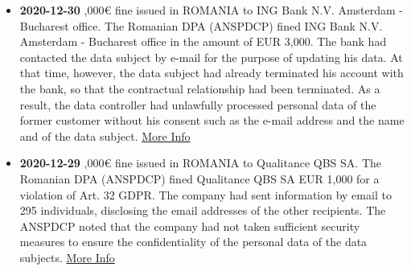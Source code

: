 \documentclass[12pt]{article}
\begin{document}
\newpage
\justify
	\begin{multicols}{2}
		\begin{itemize}
			\item \textbf{2020-12-30} ,000€ fine issued in ROMANIA to ING Bank N.V. Amsterdam - Bucharest office.
			\newline
			The Romanian DPA (ANSPDCP) fined ING Bank N.V. Amsterdam - Bucharest office in the amount of EUR 3,000. The bank had contacted the data subject by e-mail for the purpose of updating his data. At that time, however, the data subject had already terminated his account with the bank, so that the contractual relationship had been terminated. As a result, the data controller had unlawfully processed personal data of the former customer without his consent such as the e-mail address and the name and of the data subject.
			\newline
			\href{https://www.dataprotection.ro/?page=Comunicat_presa_30_12_2020&lang=ro}{More Info}
			\vspace{1cm}
	
			\item \textbf{2020-12-29} ,000€ fine issued in ROMANIA to Qualitance QBS SA.
			\newline
			The Romanian DPA (ANSPDCP) fined Qualitance QBS SA EUR 1,000 for a violation of Art. 32 GDPR. The company had sent information by email to 295 individuals, disclosing the email addresses of the other recipients. The ANSPDCP noted that the company had not taken sufficient security measures to ensure the confidentiality of the personal data of the data subjects.
			\newline
			\href{https://www.dataprotection.ro/?page=Comunicat_Presa_29_12_2020&lang=ro}{More Info}
			\vspace{1cm}
	

\end{itemize}
\end{multicols}
\end{document}
